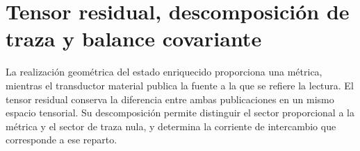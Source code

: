 

%

\chapter{Tensor residual, descomposición de traza y balance covariante}
\label{x_reciprocidad:vii:sec:tensor-residual-balance}

La realización geométrica del estado enriquecido proporciona una métrica,
mientras el transductor material publica la fuente a la que se refiere la
lectura. El tensor residual conserva la diferencia entre ambas publicaciones
en un mismo espacio tensorial. Su descomposición permite distinguir el
sector proporcional a la métrica y el sector de traza nula, y determina
la corriente de intercambio que corresponde a ese reparto.

